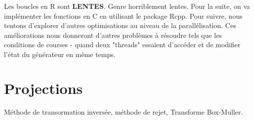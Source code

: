 \documentclass[10pt]{article} %
\begin{document}
Les boucles en R sont \textbf{LENTES}. Genre horriblement lentes. Pour la suite, on va implémenter les fonctions en C en utilisant le package Rcpp. Pour suivre, nous tentons d'explorer d'autres optimisations au niveau de la parallélisation. Ces améliorations nous donneront d'autres problèmes à résoudre tels que les conditions de courses - quand deux "threads" essaient d'accéder et
de modifier l'état du générateur en même temps.

\section{Projections}

Méthode de transormation inversée, méthode de rejet, Transforme Box-Muller.
\end{document}
